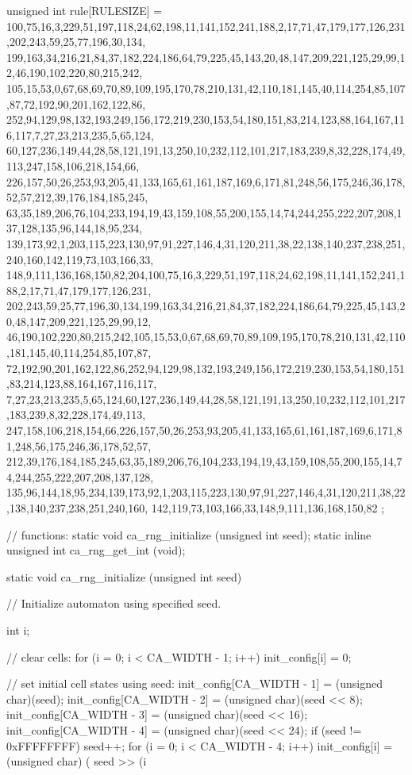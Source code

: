 \documentclass{article}
\begin{document}
\begin{ccode}
unsigned int rule[RULESIZE] = {
   100,75,16,3,229,51,197,118,24,62,198,11,141,152,241,188,2,17,71,47,179,177,126,231,202,243,59,25,77,196,30,134,
   199,163,34,216,21,84,37,182,224,186,64,79,225,45,143,20,48,147,209,221,125,29,99,12,46,190,102,220,80,215,242,
   105,15,53,0,67,68,69,70,89,109,195,170,78,210,131,42,110,181,145,40,114,254,85,107,87,72,192,90,201,162,122,86,
   252,94,129,98,132,193,249,156,172,219,230,153,54,180,151,83,214,123,88,164,167,116,117,7,27,23,213,235,5,65,124,
   60,127,236,149,44,28,58,121,191,13,250,10,232,112,101,217,183,239,8,32,228,174,49,113,247,158,106,218,154,66,
   226,157,50,26,253,93,205,41,133,165,61,161,187,169,6,171,81,248,56,175,246,36,178,52,57,212,39,176,184,185,245,
   63,35,189,206,76,104,233,194,19,43,159,108,55,200,155,14,74,244,255,222,207,208,137,128,135,96,144,18,95,234,
   139,173,92,1,203,115,223,130,97,91,227,146,4,31,120,211,38,22,138,140,237,238,251,240,160,142,119,73,103,166,33,
   148,9,111,136,168,150,82,204,100,75,16,3,229,51,197,118,24,62,198,11,141,152,241,188,2,17,71,47,179,177,126,231,
   202,243,59,25,77,196,30,134,199,163,34,216,21,84,37,182,224,186,64,79,225,45,143,20,48,147,209,221,125,29,99,12,
   46,190,102,220,80,215,242,105,15,53,0,67,68,69,70,89,109,195,170,78,210,131,42,110,181,145,40,114,254,85,107,87,
   72,192,90,201,162,122,86,252,94,129,98,132,193,249,156,172,219,230,153,54,180,151,83,214,123,88,164,167,116,117,
   7,27,23,213,235,5,65,124,60,127,236,149,44,28,58,121,191,13,250,10,232,112,101,217,183,239,8,32,228,174,49,113,
   247,158,106,218,154,66,226,157,50,26,253,93,205,41,133,165,61,161,187,169,6,171,81,248,56,175,246,36,178,52,57,
   212,39,176,184,185,245,63,35,189,206,76,104,233,194,19,43,159,108,55,200,155,14,74,244,255,222,207,208,137,128,
   135,96,144,18,95,234,139,173,92,1,203,115,223,130,97,91,227,146,4,31,120,211,38,22,138,140,237,238,251,240,160,
   142,119,73,103,166,33,148,9,111,136,168,150,82
};

// functions:
static void ca_rng_initialize (unsigned int seed);
static inline unsigned int ca_rng_get_int (void);

static void ca_rng_initialize (unsigned int seed) {
// Initialize automaton using specified seed.

   int i;

   // clear cells:
   for (i = 0; i < CA_WIDTH - 1; i++) 
      init_config[i] = 0;

   // set initial cell states using seed:
   init_config[CA_WIDTH - 1] = (unsigned char)(seed);
   init_config[CA_WIDTH - 2] = (unsigned char)(seed << 8);
   init_config[CA_WIDTH - 3] = (unsigned char)(seed << 16);
   init_config[CA_WIDTH - 4] = (unsigned char)(seed << 24);
   if (seed != 0xFFFFFFFF)
      seed++;
   for (i = 0; i < CA_WIDTH - 4; i++) 
     init_config[i] = (unsigned char) ( seed >> (i %

}
\end{ccode}
\end{document}
